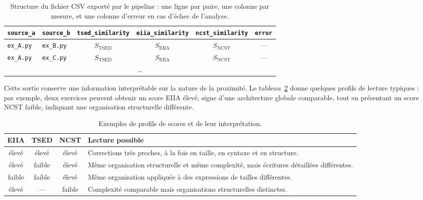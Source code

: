 \documentclass[12pt,a4paper,oneside]{report}
\begin{document}
\begin{table}[htbp]
\centering
\small
\begin{tabular}{llcccc}
\toprule
\texttt{source\_a} & \texttt{source\_b} & \texttt{tsed\_similarity} &
\texttt{eiia\_similarity} & \texttt{ncst\_similarity} & \texttt{error} \\
\midrule
\texttt{ex\_A.py} & \texttt{ex\_B.py} & $S_{\mathrm{TSED}}$ & $S_{\mathrm{EIIA}}$ & $S_{\mathrm{NCST}}$ & --- \\
\texttt{ex\_A.py} & \texttt{ex\_C.py} & $S_{\mathrm{TSED}}$ & $S_{\mathrm{EIIA}}$ & $S_{\mathrm{NCST}}$ & --- \\
\multicolumn{6}{c}{\dots} \\
\bottomrule
\end{tabular}
\caption{Structure du fichier CSV exporté par le pipeline : une ligne par
paire, une colonne par mesure, et une colonne d'erreur en cas d'échec de
l'analyse.}
\label{tab:csv}
\end{table}

Cette sortie conserve une information interprétable sur la nature de la
proximité. Le tableau~\ref{tab:profils} donne quelques profils de lecture
typiques : par exemple, deux exercices peuvent obtenir un score EIIA élevé,
signe d'une architecture globale comparable, tout en présentant un score NCST
faible, indiquant une organisation structurelle différente.

\begin{table}[htbp]
\centering
\small
\renewcommand{\arraystretch}{1.2}
\begin{tabularx}{\textwidth}{cccX}
\toprule
\textcolor{eiiacol}{\textbf{EIIA}} & \textcolor{tsedcol}{\textbf{TSED}} &
\textcolor{ncstcol}{\textbf{NCST}} & \textbf{Lecture possible} \\
\midrule
élevé & élevé & élevé & Corrections très proches, à la fois en taille, en syntaxe et en structure. \\
élevé & faible & élevé & Même organisation structurelle et même complexité, mais écritures détaillées différentes. \\
faible & faible & élevé & Même organisation appliquée à des expressions de tailles différentes. \\
élevé & --- & faible & Complexité comparable mais organisations structurelles distinctes. \\
\bottomrule
\end{tabularx}
\caption{Exemples de profils de scores et de leur interprétation.}
\label{tab:profils}
\end{table}
\end{document}
